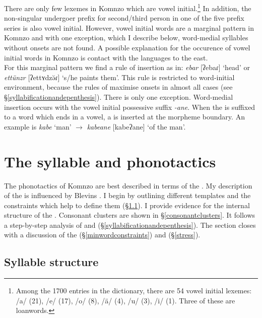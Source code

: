 There are only few lexemes in Komnzo which are vowel initial.\footnote{Among the 1700 entries in the dictionary, there are 54 vowel initial lexemes: /a/ (21), /e/ (17), /o/ (8), /ä/ (4), /u/ (3), /i/ (1). Three of these are loanwords.} In addition, the non-singular undergoer prefix for second/third person in one of the five prefix series is also vowel initial. However, vowel initial words are a marginal pattern in Komnzo and with one exception, which I describe below, word-medial syllables without onsets are not found. A possible explanation for the occurence of vowel initial words in Komnzo is contact with the  languages to the east.\\

For this marginal pattern we find a rule of  insertion as in: \emph{ebar} [ʔebaɾ] `head' or \emph{ettünzr} [ʔettʏdzə̆ɾ] `s/he paints them'. This rule is restricted to word-initial environment, because the rules of  maximise onsets in almost all cases (see \S{}\ref{syllabificationandepenthesis}). There is only one exception. Word-medial  insertion occurs with the vowel initial possessive suffix \emph{-ane}. When the  is suffixed to a word which ends in a vowel, a  is inserted at the morpheme boundary. An example is \emph{kabe} `man' $\rightarrow$ \emph{kabeane} [kabeʔane] `of the man'.

\section{The syllable and phonotactics} \label{syllable-and-phonotactics}

The phonotactics of Komnzo are best described in terms of the . My description of the  is influenced by Blevins \citeyearpar{Blevins:1995tt}. I begin by outlining different  templates and the constraints which help to define them (\S{}\ref{syllstruc}). I provide evidence for the internal structure of the . Consonant clusters are shown in \S\ref{consonantclusters}. It follows a step-by-step analysis of  and  (\S{}\ref{syllabificationandepenthesis}). The section closes with a discussion of the  (\S\ref{minwordconstraints}) and  (\S{}\ref{stress}).

\subsection{Syllable structure} \label{syllstruc}

